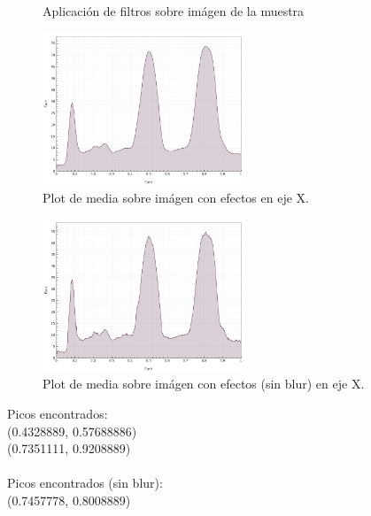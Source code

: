 \begin{itemize}
\begin{figure}[H]
	\caption{Aplicaci\'on de filtros sobre im\'agen de la muestra}
	\centering
	\end{figure}
	\begin{figure}[H]
	  \vspace{-0.2cm}
	  \centering
	  \includegraphics[width=230px]{imagenes-jtlc/experimento/search-peaks/3/plot-x}
	  \centering
	  \vspace{-0.4cm}
	  \caption{Plot de media sobre im\'agen con efectos en eje X.}
	  \label{fig:sp-3-plot-x}
	  \vspace{-0.15cm}
	\end{figure}
	\begin{figure}[H]
	  \vspace{-0.2cm}
	  \centering
	  \includegraphics[width=230px]{imagenes-jtlc/experimento/search-peaks/3/plot-x-no-blur}
	  \centering
	  \vspace{-0.4cm}
	  \caption{Plot de media sobre im\'agen con efectos (sin blur) en eje X.}
	  \label{fig:sp-3-plot-x-no-blur}
	  \vspace{-0.15cm}
	\end{figure}
	Picos encontrados:\\
	(0.4328889, 0.57688886)\\
	(0.7351111, 0.9208889)\\ \\
	Picos encontrados (sin blur): \\
	(0.7457778, 0.8008889)\\
	

\end{itemize}
